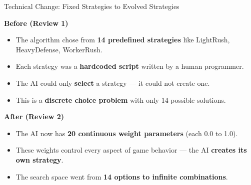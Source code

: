 \documentclass[aspectratio=169, 10pt]{beamer}
\begin{document}
\begin{frame}{Technical Change: Fixed Strategies to Evolved Strategies}

\textbf{\textcolor{amritaMaroon}{Before (Review 1)}}
\begin{itemize}
    \item The algorithm chose from \textbf{14 predefined strategies} like LightRush, HeavyDefense, WorkerRush.
    \item Each strategy was a \textbf{hardcoded script} written by a human programmer.
    \item The AI could only \textbf{select} a strategy --- it could not create one.
    \item This is a \textbf{discrete choice problem} with only 14 possible solutions.
\end{itemize}

\vspace{0.4cm}
\textbf{\textcolor{amritaMaroon}{After (Review 2)}}
\begin{itemize}
    \item The AI now has \textbf{20 continuous weight parameters} (each 0.0 to 1.0).
    \item These weights control every aspect of game behavior --- the AI \textbf{creates its own strategy}.
    \item The search space went from \textbf{14 options to infinite combinations}.
\end{itemize}

\end{frame}
\end{document}
